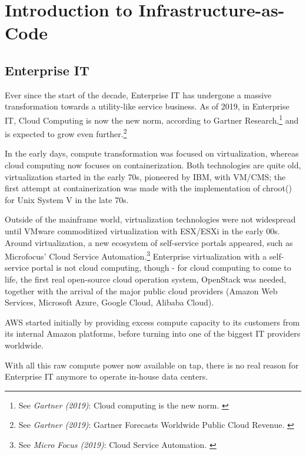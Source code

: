 %
%

\pagebreak
\section{Introduction to Infrastructure-as-Code}

\onehalfspacing

\subsection{Enterprise IT}

Ever since the start of the decade, Enterprise IT has undergone a massive transformation towards a utility-like service business. As of 2019, in Enterprise IT, Cloud Computing is now the new norm, according to Gartner Research,\footnote{See \textit{Gartner (2019)}: Cloud computing is the new norm. \cite{gartnerCloudStatement}} and is expected to grow even further.\footnote{See \textit{Gartner (2019)}: Gartner Forecasts Worldwide Public Cloud Revenue. \cite{gartnerForecast}}

In the early days, compute transformation was focused on virtualization, whereas cloud computing now focuses on containerization. Both technologies are quite old, virtualization started in the early 70s, pioneered by IBM, with VM/CMS; the first attempt at containerization was made with the implementation of chroot() for Unix System V in the late 70s.

Outside of the mainframe world, virtualization technologies were not widespread until VMware commoditized virtualization with ESX/ESXi in the early 00s. Around virtualization, a new ecosystem of self-service portals appeared, such as Microfocus' Cloud Service Automation.\footnote{See \textit{Micro Focus (2019)}: Cloud Service Automation. \cite{csaMF}} Enterprise virtualization with a self-service portal is not cloud computing, though - for cloud computing to come to life, the first real open-source cloud operation system, OpenStack was needed, together with the arrival of the major public cloud providers (Amazon Web Services, Microsoft Azure, Google Cloud, Alibaba Cloud).

AWS started initially by providing excess compute capacity to its customers from its internal Amazon platforms, before turning into one of the biggest IT providers worldwide.

With all this raw compute power now available on tap, there is no real reason for Enterprise IT anymore to operate in-house data centers.

